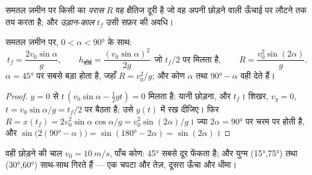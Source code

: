 \begin{definition}[परास]\label{def:g12:projectile-motion:range}
समतल ज़मीन पर किसी  का \emph{परास} $R$ वह
क्षैतिज दूरी है जो वह अपनी छोड़ने वाली ऊँचाई पर लौटने तक तय करता है; और
\emph{उड़ान-काल} $t_f$ उसी सफ़र की अवधि।
\end{definition}

\begin{proposition}[शिखर, उड़ान-काल, परास]\label{prop:g12:projectile-motion:range}
समतल ज़मीन पर, $0 < \alpha < \ang{90}$ के साथ:
\[
t_f = \frac{2 v_0 \sin\alpha}{g}, \qquad
h_{\text{शीर्ष}} = \frac{(v_0\sin\alpha)^2}{2g}
\ \ \text{जो } t_f/2 \text{ पर मिलता है}, \qquad
R = \frac{v_0^2 \sin(2\alpha)}{g}.
\]
 $\alpha = \ang{45}$ पर सबसे बड़ा होता है, जहाँ $R = v_0^2/g$; और  कोण $\alpha$
तथा $\ang{90} - \alpha$ वही  देते हैं।
\end{proposition}

\begin{proof}
$y = 0$ से $t\,(v_0\sin\alpha - \tfrac12 gt) = 0$ मिलता है: यानी छोड़ना, और $t_f$। शिखर, $v_y = 0$, $t = v_0\sin\alpha/g = t_f/2$
पर बैठता है; उसे $y(t)$ में रख दीजिए। फिर $R = x(t_f) = 2v_0^2\sin\alpha\cos\alpha/g =
v_0^2\sin(2\alpha)/g$। ज्या $2\alpha = \ang{90}$ पर चरम पर
होती है, और $\sin\bigl(2(\ang{90}-\alpha)\bigr) = \sin(\ang{180} - 2\alpha) =
\sin(2\alpha)$।
\end{proof}

\begin{omfigure}

{\small वही छोड़ने की चाल $v_0 = \qty{10}{m/s}$, पाँच कोण: \ang{45} सबसे दूर फेंकता है; और
युग्म (\ang{15},\ang{75}) तथा (\ang{30},\ang{60}) साथ-साथ गिरते हैं --- एक चपटा और
तेज़, दूसरा ऊँचा और धीमा।}
\end{omfigure}


